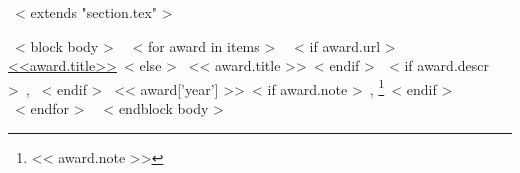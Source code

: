 ~< extends "section.tex" >~

~< block body >~
~< for award in items >~
  ~< if award.url >~
    \href{<<award.url>>}{<<award.title>>}~< else >~ << award.title >>~< endif >~~< if award.descr >~, {\scriptsize \color{gray}{<< award.descr >>}}~< endif >~
  \hfill << award['year'] >>~< if award.note >~, \footnote{<< award.note >>}~< endif >~
    \\[0.5mm]
~< endfor >~
~< endblock body >~
